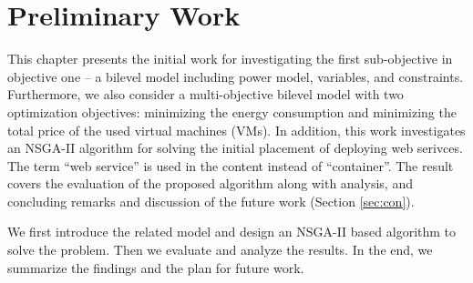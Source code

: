 \chapter{Preliminary Work}\label{C:preliminary}
This chapter presents the initial work for investigating the first sub-objective in objective one -- a bilevel model including power model, variables, and constraints. Furthermore, we also consider a multi-objective bilevel model with two optimization objectives: minimizing the energy consumption and minimizing the total price of the used virtual machines (VMs). In addition, this work investigates an NSGA-II algorithm for solving the initial placement of deploying web serivces. The term ``web service'' is used in the content instead of ``container''.
The result covers the evaluation of the proposed algorithm along with analysis, and concluding remarks and discussion of the future work (Section \ref{sec:con}). 

We first introduce the related model and design an NSGA-II based algorithm to solve the problem. Then we evaluate and analyze the results. In the end, we summarize the findings and the plan for future work.


